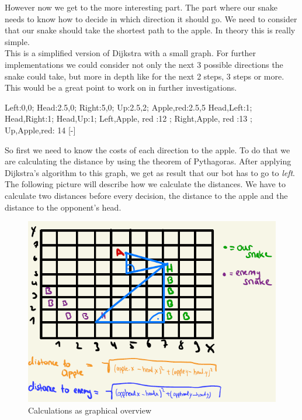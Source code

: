 \documentclass[a4paper,12pt]{article}
\begin{document}
However now we get to the more interesting part. The part where our snake needs to know how to decide in which direction it should go. We need to consider that our snake should take the shortest path to the apple. In theory this is really simple.\\
This is a simplified version of Dijkstra with a small graph. For further implementations we could consider not only the next 3 possible directions the snake could take, but more in depth like for the next 2 steps, 3 steps or more. This would be a great point to work on in further investigations.\\

\begin{center}
{
Left:0,0;
Head:2.5,0;
Right:5,0;
Up:2.5,2;
Apple,red:2.5,5
}
{
Head,Left:1;
Head,Right:1;
Head,Up:1; 
Left,Apple, red :12 ;
Right,Apple, red :13 ; 
Up,Apple,red: 14
}[-]
\dijkstra{}
\end{center}
So first we need to know the costs of each direction to the apple. To do that we are calculating the distance by using the theorem of Pythagoras. After applying Dijkstra's algorithm to this graph, we get as result that our bot has to go to \textit{left}. The following picture will describe how we calculate the distances. We have to calculate two distances before every decision, the distance to the apple and the distance to the opponent's head.\\
\begin{figure}  
\centering
\includegraphics[scale=0.8]{calcs}
\caption{Calculations as graphical overview}
\end{figure}
\end{document}
